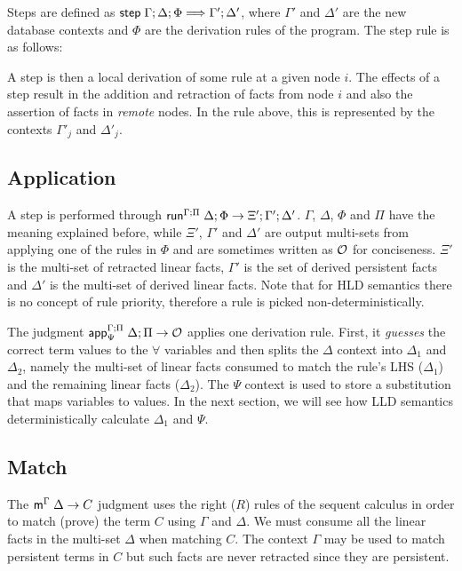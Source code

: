 Steps are defined as $\stepz \Gamma; \Delta; \Phi \Longrightarrow \Gamma';
\Delta'$, where $\Gamma'$ and $\Delta'$ are the new database contexts and $\Phi$
are the derivation rules of the program. The step rule is as follows:



A step is then a local derivation of some rule at a given node $i$. The effects
of a step result in the addition and retraction of facts from node $i$ and also
the assertion of facts in \emph{remote} nodes. In the rule above, this is
represented by the contexts $\Gamma'_j$ and $\Delta'_j$.

\subsection{Application}

A step is performed through
$\doz{\Gamma}{\Delta}{\Phi}{\Pi}{\Xi'}{\Gamma'}{\Delta'}$.  $\Gamma$, $\Delta$,
$\Phi$ and $\Pi$ have the meaning explained before, while $\Xi'$, $\Gamma'$ and
$\Delta'$ are output multi-sets from applying one of the rules in $\Phi$ and are
sometimes written as $\outsem$ for conciseness. $\Xi'$ is the multi-set of
retracted linear facts, $\Gamma'$ is the set of derived persistent facts and
$\Delta'$ is the multi-set of derived linear facts.  Note that for HLD semantics
there is no concept of rule priority, therefore a rule is picked
non-deterministically.

The judgment $\az{\Psi}{\Gamma}{\Delta}{\Pi}{A \lolli B}{\outsem}$ applies one
derivation rule. First, it \emph{guesses} the correct term values to the
$\forall$ variables and then splits the $\Delta$ context into $\Delta_1$ and
$\Delta_2$, namely the multi-set of linear facts consumed to match the rule's
LHS ($\Delta_1$) and the remaining linear facts ($\Delta_2$). The $\Psi$ context
is used to store a substitution that maps variables to values. In the next
section, we will see how LLD semantics deterministically calculate $\Delta_1$
and $\Psi$.



\subsection{Match}

The $\mz{\Gamma}{\Delta}{C}$ judgment uses the right ($R$) rules of the sequent
calculus in order to match (prove) the term $C$ using $\Gamma$ and $\Delta$. We
must consume all the linear facts in the multi-set $\Delta$ when matching $C$.
The context $\Gamma$ may be used to match persistent terms in $C$ but such facts
are never retracted since they are persistent.

